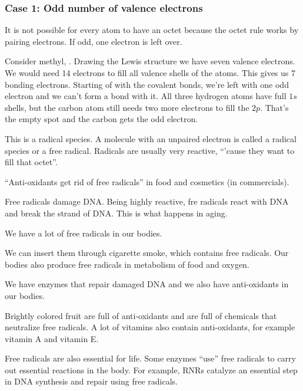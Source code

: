 \documentclass[../mit-general-chemistry.tex]{subfiles}
\begin{document}
\subsubsection{Case 1: Odd number of valence electrons}


It is not possible for every atom to have an octet because the octet
rule works by pairing electrons. If odd, one electron is left over.

Consider methyl, . Drawing the Lewis structure we have seven valence
electrons. We would need 14 electrons to fill all valence shells of
the atoms. This gives us 7 bonding electrons. Starting of with the
covalent bonds, we're left with one odd electron and we can't form a
bond with it. All three hydrogen atoms have full $1s$ shells, but the
carbon atom still needs two more electrons to fill the $2p$. That's
the empty spot and the carbon gets the odd electron.

\begin{center}
\end{center}

This is a radical species. A molecule with an unpaired electron is
called a radical species or a free radical. Radicals are usually very
reactive, ``'cause they want to fill that octet''.

``Anti-oxidants get rid of free radicals'' in food and cosmetics (in
commercials).

\begin{example}
  Free radicals damage DNA. Being highly reactive, fre radicals react
  with DNA and break the strand of DNA. This is what happens in aging.

  We have a lot of free radicals in our bodies.

  We can insert them through cigarette smoke, which contains free
  radicals. Our bodies also produce free radicals in metabolism of
  food and oxygen.

  We have enzymes that repair damaged DNA and we also have
  anti-oxidants in our bodies.

  Brightly colored fruit are full of anti-oxidants and are full of
  chemicals that neutralize free radicals. A lot of
  vitamins also contain anti-oxidants, for example vitamin A and
  vitamin E.

  Free radicals are also essential for life. Some enzymes ``use'' free
  radicals to carry out essential reactions in the body. For example,
  RNRs catalyze an essential step in DNA synthesis and repair using
  free radicals.
\end{example}
\end{document}
